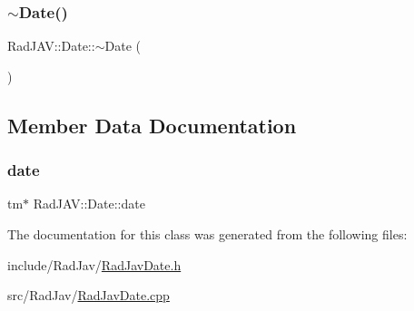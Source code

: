 \mbox{\label{class_rad_j_a_v_1_1_date_a3a74fb42f5bdae383b95b42bb83beb2f}} 
\subsubsection{\texorpdfstring{$\sim$\+Date()}{~Date()}}
{\footnotesize\ttfamily Rad\+J\+A\+V\+::\+Date\+::$\sim$\+Date (\begin{DoxyParamCaption}{ }\end{DoxyParamCaption})}



\subsection{Member Data Documentation}
\mbox{\label{class_rad_j_a_v_1_1_date_a6cda5db94bdee29181ec009709f00de3}} 
\subsubsection{\texorpdfstring{date}{date}}
{\footnotesize\ttfamily tm$\ast$ Rad\+J\+A\+V\+::\+Date\+::date\hspace{0.3cm}{\ttfamily [protected]}}



The documentation for this class was generated from the following files\+:\begin{DoxyCompactItemize}
\item 
include/\+Rad\+Jav/\mbox{\hyperlink{_rad_jav_date_8h}{Rad\+Jav\+Date.\+h}}\item 
src/\+Rad\+Jav/\mbox{\hyperlink{_rad_jav_date_8cpp}{Rad\+Jav\+Date.\+cpp}}\end{DoxyCompactItemize}

